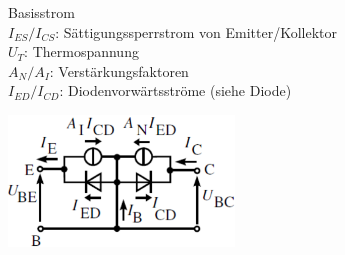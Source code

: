     \begin{minipage}[T]{13cm}
      Basisstrom
      \hspace{25.1mm}\vspace{1mm}\\ 
      \hspace*{43mm}$I_{ES}/I_{CS}$: S\"attigungssperrstrom von Emitter/Kollektor\\
      \hspace*{43mm}$U_T$: Thermospannung\\
      \hspace*{43mm}$A_N / A_I$: Verst\"arkungsfaktoren\\
      \hspace*{43mm}$I_{ED}/I_{CD}$: Diodenvorw\"artsstr\"ome (siehe Diode)\\
    \end{minipage}
    \begin{minipage}[T]{6cm}
      \includegraphics[width=6cm]{./bilder/EberMollModell.png}
    \end{minipage}
            
